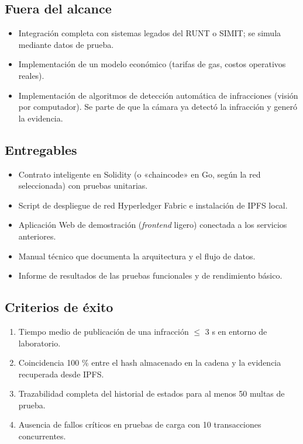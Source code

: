\subsection{Fuera del alcance}
\begin{itemize}
  \item Integración completa con sistemas legados del RUNT o SIMIT; se simula mediante datos de prueba.
  \item Implementación de un modelo económico (tarifas de gas, costos operativos reales).
  \item Implementación de algoritmos de detección automática de infracciones (visión por computador).  
        Se parte de que la cámara ya detectó la infracción y generó la evidencia.
\end{itemize}

\subsection{Entregables}
\begin{itemize}
  \item Contrato inteligente en Solidity (o «chaincode» en Go, según la red seleccionada) con pruebas unitarias.
  \item Script de despliegue de red Hyperledger Fabric e instalación de IPFS local.
  \item Aplicación Web de demostración (\emph{frontend} ligero) conectada a los servicios anteriores.
  \item Manual técnico que documenta la arquitectura y el flujo de datos.
  \item Informe de resultados de las pruebas funcionales y de rendimiento básico.
\end{itemize}

\subsection{Criterios de éxito}
\begin{enumerate}
  \item Tiempo medio de publicación de una infracción $\leq$ 3 s en entorno de laboratorio.
  \item Coincidencia 100 \% entre el hash almacenado en la cadena y la evidencia recuperada desde IPFS.
  \item Trazabilidad completa del historial de estados para al menos 50 multas de prueba.
  \item Ausencia de fallos críticos en pruebas de carga con 10 transacciones concurrentes.
\end{enumerate}

